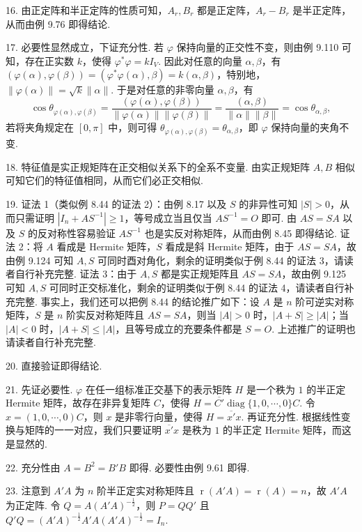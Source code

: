 \documentclass[UTF8,12pt,a4paper,fontset=fandol]{ctexart}
\begin{document}
16. 由正定阵和半正定阵的性质可知，$A_r,B_r$ 都是正定阵，$A_r-B_r$ 是半正定阵，从而由例 9.76 即得结论.

17. 必要性显然成立，下证充分性. 若 $\varphi$ 保持向量的正交性不变，则由例 9.110 可知，存在正实数 $k$，使得 $\varphi^*\varphi=kI_V$. 因此对任意的向量 $\alpha,\beta$，有 $(\varphi(\alpha),\varphi(\beta))=(\varphi^*\varphi(\alpha),\beta)=k(\alpha,\beta)$，特别地，$\|\varphi(\alpha)\|=\sqrt{k}\|\alpha\|$. 于是对任意的非零向量 $\alpha,\beta$，有
\[
\cos\theta_{\varphi(\alpha),\varphi(\beta)}
=\frac{(\varphi(\alpha),\varphi(\beta))}{\|\varphi(\alpha)\|\|\varphi(\beta)\|}
=\frac{(\alpha,\beta)}{\|\alpha\|\|\beta\|}
=\cos\theta_{\alpha,\beta},
\]
若将夹角规定在 $[0,\pi]$ 中，则可得 $\theta_{\varphi(\alpha),\varphi(\beta)}=\theta_{\alpha,\beta}$，即 $\varphi$ 保持向量的夹角不变.

18. 特征值是实正规矩阵在正交相似关系下的全系不变量. 由实正规矩阵 $A,B$ 相似可知它们的特征值相同，从而它们必正交相似.

19. 证法 1（类似例 8.44 的证法 2）：由例 8.17 以及 $S$ 的非异性可知 $|S|>0$，从而只需证明 $|I_n+AS^{-1}|\ge1$，等号成立当且仅当 $AS^{-1}=O$ 即可. 由 $AS=SA$ 以及 $S$ 的反对称性容易验证 $AS^{-1}$ 也是实反对称矩阵，从而由例 8.45 即得结论. 证法 2：将 $A$ 看成是 Hermite 矩阵，$S$ 看成是斜 Hermite 矩阵，由于 $AS=SA$，故由例 9.124 可知 $A,S$ 可同时酉对角化，剩余的证明类似于例 8.44 的证法 3，请读者自行补充完整. 证法 3：由于 $A,S$ 都是实正规矩阵且 $AS=SA$，故由例 9.125 可知 $A,S$ 可同时正交标准化，剩余的证明类似于例 8.44 的证法 4，请读者自行补充完整. 事实上，我们还可以把例 8.44 的结论推广如下：设 $A$ 是 $n$ 阶可逆实对称矩阵，$S$ 是 $n$ 阶实反对称矩阵且 $AS=SA$，则当 $|A|>0$ 时，$|A+S|\ge |A|$；当 $|A|<0$ 时，$|A+S|\le |A|$，且等号成立的充要条件都是 $S=O$. 上述推广的证明也请读者自行补充完整.

20. 直接验证即得结论.

21. 先证必要性. $\varphi$ 在任一组标准正交基下的表示矩阵 $H$ 是一个秩为 $1$ 的半正定 Hermite 矩阵，故存在非异复矩阵 $C$，使得 $H=\overline{C'}\operatorname{diag}\{1,0,\cdots,0\}C$. 令 $x=(1,0,\cdots,0)C$，则 $x$ 是非零行向量，使得 $H=\overline{x'}x$. 再证充分性. 根据线性变换与矩阵的一一对应，我们只要证明 $\overline{x'}x$ 是秩为 $1$ 的半正定 Hermite 矩阵，而这是显然的.

22. 充分性由 $A=B^2=B'B$ 即得. 必要性由例 9.61 即得.

23. 注意到 $A'A$ 为 $n$ 阶半正定实对称矩阵且 $\operatorname{r}(A'A)=\operatorname{r}(A)=n$，故 $A'A$ 为正定阵. 令 $Q=A(A'A)^{-\frac{1}{2}}$，则 $P=QQ'$ 且 $Q'Q=(A'A)^{-\frac{1}{2}}A'A(A'A)^{-\frac{1}{2}}=I_n$.
\end{document}
